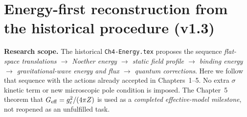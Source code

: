 \documentclass[11pt,a4paper]{article}
\theoremstyle{definition}\newtheorem{definition}[theorem]{Definition}
\theoremstyle{remark}\newtheorem{remark}[theorem]{Remark}
\begin{document}
\section{Energy-first reconstruction from the historical procedure (v1.3)}
\label{sec:v13-energyfirst}
\textbf{Research scope.} The  historical \texttt{Ch4-Energy.tex} proposes the sequence
\emph{flat-space translations $\to$ Noether energy $\to$ static field profile $\to$
binding energy $\to$ gravitational-wave energy and flux $\to$ quantum corrections}.
Here we follow that sequence with the actions already accepted in Chapters~1--5.
No extra $\sigma$ kinetic term or new microscopic pole condition is imposed.
The Chapter~5 theorem that $G_{\rm eff}=g_c^2/(4\pi Z)$ is used as a
\emph{completed effective-model milestone}, not reopened as an unfulfilled task.
\end{document}
